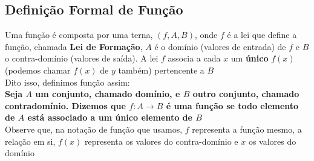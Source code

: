 \documentclass{article}
\begin{document}
\subsection{Definição Formal de Função}
Uma função é composta por uma terna, $(f, A, B)$, onde $f$ é a lei que define a função, chamada \textbf{Lei de Formação}, $A$ é o domínio (valores de entrada) de $f$ e $B$ o contra-domínio (valores de saída). A lei $f$ associa a cada $x$ um \textbf{único} $f(x)$ (podemos chamar $f(x)$ de $y$ também) pertencente a $B$
\\[10pt]
Dito isso, definimos função assim:
\\[10pt]
\textbf{Seja \( A \) um conjunto, chamado domínio, e \( B \) outro conjunto, chamado contradomínio. Dizemos que \( f : A \to B \) é uma função se todo elemento de \( A \) está associado a um único elemento de \( B \)}
\\[10pt]
Observe que, na notação de função que usamos, $f$ representa a função mesmo, a relação em si, $f(x)$ representa os valores do contra-domínio e $x$ os valores do domínio
\end{document}
